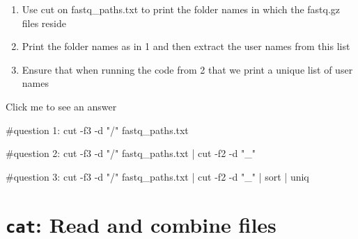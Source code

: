 \documentclass[
  letterpaper,
  DIV=11,
  numbers=noendperiod]{scrreprt}
\newenvironment{Shaded}{}{}
\newcommand{\AttributeTok}[1]{\textcolor[rgb]{0.84,0.23,0.29}{#1}}
\newcommand{\CommentTok}[1]{\textcolor[rgb]{0.42,0.45,0.49}{#1}}
\newcommand{\FunctionTok}[1]{\textcolor[rgb]{0.44,0.26,0.76}{#1}}
\newcommand{\KeywordTok}[1]{\textcolor[rgb]{0.84,0.23,0.29}{#1}}
\newcommand{\NormalTok}[1]{\textcolor[rgb]{0.14,0.16,0.18}{#1}}
\newcommand{\StringTok}[1]{\textcolor[rgb]{0.01,0.18,0.38}{#1}}
\providecommand{\tightlist}{%
  \setlength{\itemsep}{0pt}\setlength{\parskip}{0pt}}\usepackage{longtable,booktabs,array}
\begin{document}
\begin{tcolorbox}[enhanced jigsaw, colframe=quarto-callout-caution-color-frame, colbacktitle=quarto-callout-caution-color!10!white, opacitybacktitle=0.6, breakable, titlerule=0mm, colback=white, toptitle=1mm, leftrule=.75mm, opacityback=0, coltitle=black, left=2mm, toprule=.15mm, bottomtitle=1mm, rightrule=.15mm, title=\textcolor{quarto-callout-caution-color}{\faFire}\hspace{0.5em}{Exercise}, bottomrule=.15mm, arc=.35mm]

\begin{enumerate}
\def\labelenumi{\arabic{enumi}.}
\tightlist
\item
  Use cut on fastq\_paths.txt to print the folder names in which the
  fastq.gz files reside
\item
  Print the folder names as in 1 and then extract the user names from
  this list
\item
  Ensure that when running the code from 2 that we print a unique list
  of user names
\end{enumerate}

Click me to see an answer

\begin{Shaded}
\begin{Highlighting}[]
\CommentTok{\#question 1:}
\FunctionTok{cut} \AttributeTok{{-}f3} \AttributeTok{{-}d} \StringTok{"/"}\NormalTok{ fastq\_paths.txt}

\CommentTok{\#question 2:}
\FunctionTok{cut} \AttributeTok{{-}f3} \AttributeTok{{-}d} \StringTok{"/"}\NormalTok{ fastq\_paths.txt }\KeywordTok{|} \FunctionTok{cut} \AttributeTok{{-}f2} \AttributeTok{{-}d} \StringTok{"\_"}

\CommentTok{\#question 3:}
\FunctionTok{cut} \AttributeTok{{-}f3} \AttributeTok{{-}d} \StringTok{"/"}\NormalTok{ fastq\_paths.txt }\KeywordTok{|} \FunctionTok{cut} \AttributeTok{{-}f2} \AttributeTok{{-}d} \StringTok{"\_"} \KeywordTok{|} \FunctionTok{sort} \KeywordTok{|} \FunctionTok{uniq}
\end{Highlighting}
\end{Shaded}

\end{tcolorbox}

\section{\texorpdfstring{\texttt{cat}: Read and combine
files}{cat: Read and combine files}}\label{cat-read-and-combine-files}
\end{document}
